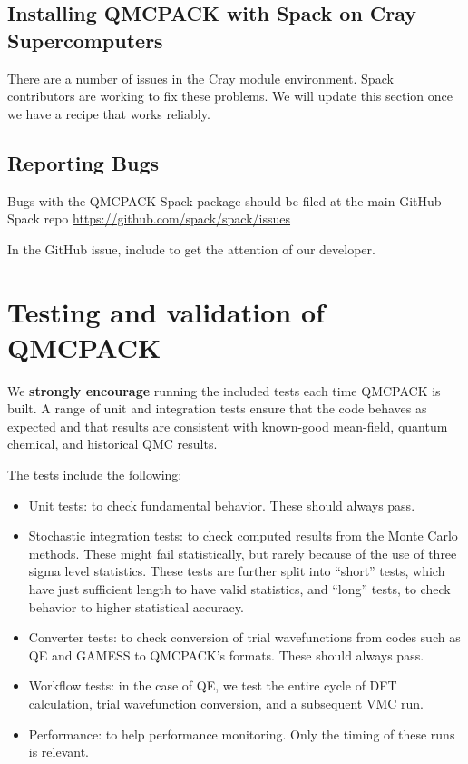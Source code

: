 \subsection{Installing QMCPACK with Spack on Cray Supercomputers}
There are a number of issues in the Cray module environment. Spack
contributors are working to fix these problems. We will update this
section once we have a recipe that works reliably.

\subsection{Reporting Bugs}
Bugs with the QMCPACK Spack package should be filed at the main GitHub
Spack repo \url{https://github.com/spack/spack/issues}

In the GitHub issue, include  to get the attention
of our developer.

\section{Testing and validation of QMCPACK}
\label{sec:testing}
We \textbf{strongly encourage} running the included tests each time
QMCPACK is built. A range of unit and integration tests ensure that
the code behaves as expected and that results are consistent with
known-good mean-field, quantum chemical, and historical QMC results.

The tests include the following:
\begin{itemize}
\item Unit tests: to check fundamental behavior. These should always pass.
\item Stochastic integration tests: to check computed results from
  the Monte Carlo methods. These might fail statistically, but rarely
  because of the use of three sigma level statistics. These tests are
  further split into ``short'' tests, which have just sufficient
  length to have valid statistics, and ``long'' tests, to check
  behavior to higher statistical accuracy.
\item Converter tests: to check conversion of trial wavefunctions
  from codes such as QE and GAMESS to QMCPACK's
  formats. These should always pass.
\item Workflow tests: in the case of QE, we test the
  entire cycle of DFT calculation, trial wavefunction conversion, and
  a subsequent VMC run.  
\item Performance: to help performance monitoring. Only the timing of
  these runs is relevant.  
\end{itemize}



